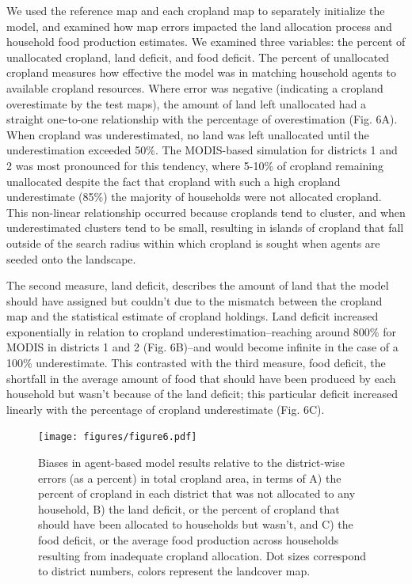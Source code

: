 \documentclass{pnastwo}
\begin{document}
\begin{article}
We used the reference map and each cropland map to separately initialize the model, and examined how map errors impacted the land allocation process and household food production estimates. We examined three variables: the percent of unallocated cropland, land deficit, and food deficit. The percent of unallocated cropland measures how effective the model was in matching household agents to available cropland resources. Where error was negative (indicating a cropland overestimate by the test maps), the amount of land left unallocated had a straight one-to-one relationship with the percentage of overestimation (Fig. 6A). When cropland was underestimated, no land was left unallocated until the underestimation exceeded 50\%. The MODIS-based simulation for districts 1 and 2 was most pronounced for this tendency, where 5-10\% of cropland remaining unallocated despite the fact that cropland with such a high cropland underestimate (85\%) the majority of households were not allocated cropland. This non-linear relationship occurred because croplands tend to cluster, and when underestimated clusters tend to be small, resulting in islands of cropland that fall outside of the search radius within which cropland is sought when agents are seeded onto the landscape. 

The second measure, land deficit, describes the amount of land that the model should have assigned but couldn't due to the mismatch between the cropland map and the statistical estimate of cropland holdings. Land deficit increased exponentially in relation to cropland underestimation--reaching around 800\% for MODIS in districts 1 and 2 (Fig. 6B)--and would become infinite in the case of a 100\% underestimate. This contrasted with the third measure, food deficit, the shortfall in the average amount of food that should have been produced by each household but wasn't because of the land deficit; this particular deficit increased linearly with the percentage of cropland underestimate (Fig. 6C). 


\begin{figure}[!ht]
\centerline{\texttt{[image: figures/figure6.pdf]}}
\caption{Biases in agent-based model results relative to the district-wise errors (as a percent) in total cropland area, in terms of A) the percent of cropland in each district that was not allocated to any household, B) the land deficit, or the percent of cropland that should have been allocated to households but wasn't, and C) the food deficit, or the average food production across households resulting from inadequate cropland allocation. Dot sizes correspond to district numbers, colors represent the landcover map.}
\label{afoto}
\end{figure}


\end{article}
\end{document}
